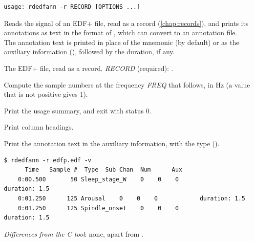 \begin{lstlisting}[style=signature,language={}]
usage: rdedfann -r RECORD [OPTIONS ...]
\end{lstlisting}
Reads the  signal of an EDF+ file, read as a record
(\cref{chap:records}), and prints its annotations as text in the format of ,
which  can convert to an annotation file. The annotation text is printed in place
of the mnemonic (by default) or as the auxiliary information (), followed by the
duration, if any.
\begin{params}
\item[-r] The EDF+ file, read as a record, \textit{RECORD} (required): .
\item[-F] Compute the sample numbers at the frequency \textit{FREQ} that follows, in Hz
  (a value that is not positive gives 1).
\item[-h] Print the usage summary, and exit with status 0.
\item[-v] Print column headings.
\item[-x] Print the annotation text in the auxiliary information, with the type
  \code{\textquotedbl} ().
\end{params}
\begin{lstlisting}[style=text]
$ rdedfann -r edfp.edf -v
      Time   Sample #  Type  Sub Chan  Num      Aux
    0:00.500       50 Sleep_stage_W    0    0    0              duration: 1.5
    0:01.250      125 Arousal    0    0    0            duration: 1.5
    0:01.250      125 Spindle_onset    0    0    0              duration: 1.5
\end{lstlisting}
\textit{Differences from the C tool}: none, apart from .

